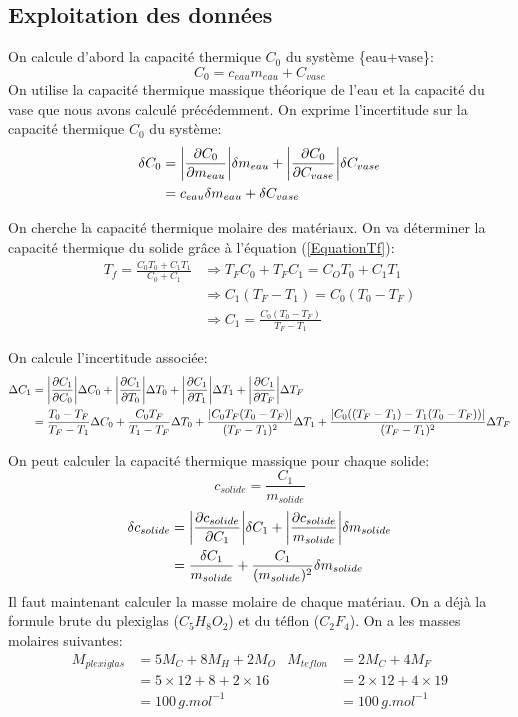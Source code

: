 \documentclass[12pt]{article}
\begin{document}
\subsection{Exploitation des données}
On calcule d'abord la capacité thermique $C_0$ du système \{eau+vase\}:
\begin{equation}
C_0=c_{eau}m_{eau}+C_{vase}
\end{equation}
On utilise la capacité thermique massique théorique de l'eau et la capacité du vase que nous avons calculé précédemment. On exprime l'incertitude sur la capacité thermique $C_0$ du système:
\begin{align*}
\delta C_0&= \abs{\frac{\partial C_0}{\partial m_{eau}}} \delta m_{eau} + \abs{\frac{\partial C_0}{\partial C_{vase}}} \delta C_{vase}\\
&=c_{eau}\delta m_{eau}+\delta C_{vase}
\end{align*}



On cherche la capacité thermique molaire des matériaux. On va déterminer la capacité thermique du solide grâce à l'équation (\ref{EquationTf}):
\begin{align*}
T_f=\frac{C_0T_0+C_1T_1}{C_0+C_1} &\Rightarrow T_FC_0+T_FC_1=C_OT_0+C_1T_1 \\
&\Rightarrow C_1(T_F-T_1)=C_0(T_0-T_F) \\
&\Rightarrow C_1=\frac{C_0(T_0-T_F)}{T_F-T_1}
\end{align*}

On calcule l'incertitude associée:
\begin{align*}
\Delta C_1 &= \abs{\frac{\partial C_1}{\partial C_0}} \Delta C_0 + \abs{\frac{\partial C_1}{\partial T_0}} \Delta T_0 + \abs{\frac{\partial C_1}{\partial T_1}} \Delta T_1 + \abs{\frac{\partial C_1}{\partial T_F}} \Delta T_F \\
&= \frac{T_0-T_F}{T_F-T_1}\Delta C_0 + \frac{C_0T_F}{T_1-T_F}\Delta T_0 + \frac{\abs{C_0T_F(T_0-T_F)}}{(T_F-T_1)^2}\Delta T_1 + \frac{\abs{C_0((T_F-T_1)-T_1(T_0-T_F))}}{(T_F-T_1)^2}\Delta T_F
\end{align*}




On peut calculer la capacité thermique massique pour chaque solide:
\begin{equation}
c_{solide}=\frac{C_1}{m_{solide}}
\end{equation}
\begin{align*}
\delta c_{solide}&=\abs{\frac{\partial c_{solide}}{\partial C_1}}\delta C_1 + \abs{\frac{\partial c_{solide}}{m_{solide}}}\delta m_{solide} \\
&=\frac{\delta C_1}{m_{solide}}+ \frac{C_1}{(m_{solide})^2}\delta m_{solide}
\end{align*}
Il faut maintenant calculer la masse molaire de chaque matériau. On a déjà la formule brute du plexiglas ($C_5H_8O_2$) et du téflon ($C_2F_4$). On a les masses molaires suivantes:
\begin{align*}
M_{plexiglas}&=5M_C+8M_H+2M_O & M_{teflon}&=2M_C+4M_F  \\
&=5\times 12+8+2\times 16 & &=2\times 12+4\times 19 \\
&=100\, g.mol^{-1} & &=100\, g.mol^{-1}
\end{align*}
\end{document}
